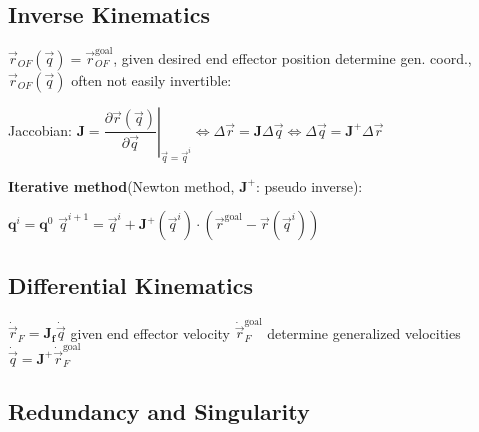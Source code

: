 \documentclass[fontsize=6pt]{scrartcl}
\newcommand{\mat}[1]{\mathbf{#1}}
\begin{document}
\begin{multicols*}{4}
\subsection*{Inverse Kinematics}

$\vec{r}_{OF}(\vec{q}) = \vec{r}_{OF}^{\text{goal}}$, given desired end effector position determine gen. coord., $\vec{r}_{OF}(\vec{q})$ often not easily invertible:

Jaccobian: $\mat J = \left. \dfrac{\partial \vec{r}(\vec q)}{\partial \vec q}\right\rvert_{\vec{q}= \vec{q}^i} \Leftrightarrow \Delta\vec{r} = \mat{J}\Delta\vec{q} \Leftrightarrow \Delta\vec{q}=\mat J^+ \Delta\vec{r}$

\textbf{Iterative method}(Newton method, $\mat J^+$: pseudo inverse):

\begin{algorithm}[H]
	\DontPrintSemicolon
	$\mathbf q^i = \mathbf q^0$\;
	{
		$\vec q^{i+1} = \vec q^i + \mat J^+(\vec q^i) \cdot (\vec r^\text{goal}
		- \vec r(\vec q^i))$
	}
\end{algorithm}


\subsection*{Differential Kinematics}

$\dot{\vec r}_F = \mat{J_f}\dot{\vec q}$ given end effector velocity $\dot{\vec r}_F^\text{goal}$ determine generalized velocities $\dot{\vec{q}} = \mat J^+ \dot{\vec{r}}_F^\text{goal}$

\subsection*{Redundancy and Singularity}


\end{multicols*}
\end{document}
